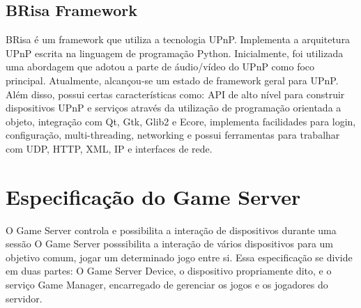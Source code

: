 \documentclass[a4paper]{sbgames}               %
\begin{document}
\subsection{BRisa Framework}

BRisa é um framework que utiliza a tecnologia UPnP. Implementa a arquitetura UPnP escrita na linguagem de programação Python. Inicialmente, foi utilizada uma abordagem que adotou a parte de áudio/vídeo do UPnP como foco principal. Atualmente, alcançou-se um estado de framework geral para UPnP. Além disso, possui certas características como: API de alto nível para construir dispositivos UPnP e serviços através da utilização de programação orientada a objeto, integração com Qt, Gtk, Glib2 e Ecore, implementa facilidades para login, configuração, multi-threading, networking e possui ferramentas para trabalhar com UDP, HTTP, XML, IP e interfaces de rede.

\section{Especificação do Game Server}
O Game Server controla e possibilita a interação de dispositivos durante uma sessão
O Game Server posssibilita a interação de vários dispositivos para um objetivo comum, jogar um determinado jogo entre si.
Essa especificação se divide em duas partes: O Game Server Device, o dispositivo propriamente dito, e o serviço Game Manager, encarregado de gerenciar os jogos e os jogadores do servidor.
\end{document}
